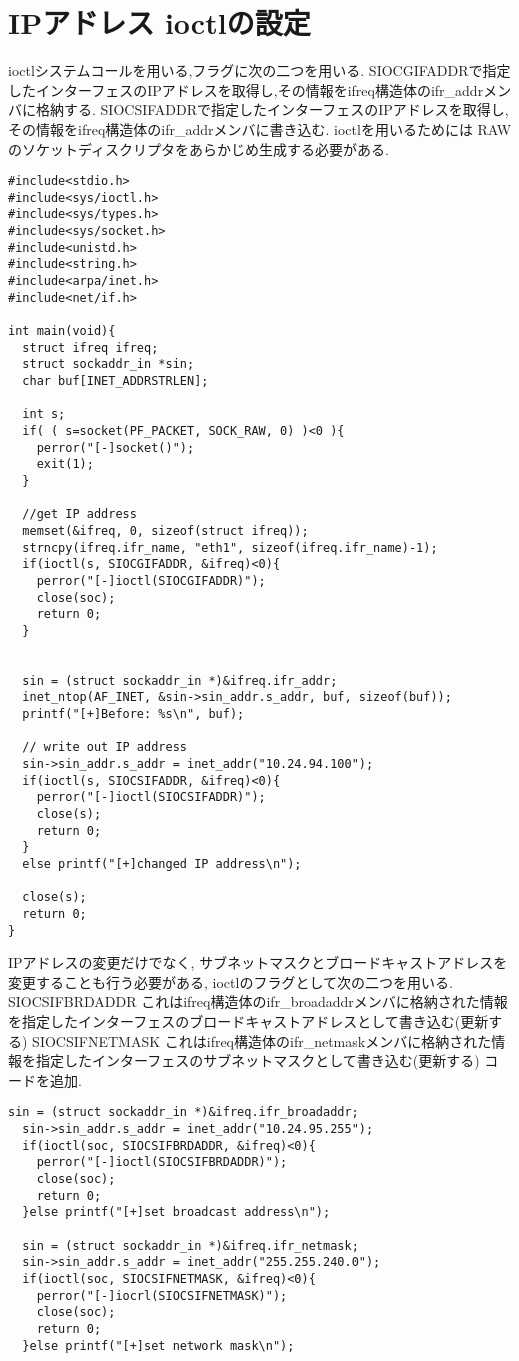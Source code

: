 \documentclass[a4paper]{article}%
\begin{document}
\section{IPアドレス ioctlの設定}
ioctlシステムコールを用いる,フラグに次の二つを用いる.
SIOCGIFADDRで指定したインターフェスのIPアドレスを取得し,その情報をifreq構造体のifr\_addrメンバに格納する.
SIOCSIFADDRで指定したインターフェスのIPアドレスを取得し,その情報をifreq構造体のifr\_addrメンバに書き込む.
ioctlを用いるためには RAWのソケットディスクリプタをあらかじめ生成する必要がある.

\begin{lstlisting}[caption=changeIPaddress, label=changeIPaddress]
#include<stdio.h>
#include<sys/ioctl.h>
#include<sys/types.h>
#include<sys/socket.h>
#include<unistd.h>
#include<string.h>
#include<arpa/inet.h>
#include<net/if.h>
 
int main(void){
  struct ifreq ifreq;
  struct sockaddr_in *sin;
  char buf[INET_ADDRSTRLEN];
 
  int s;
  if( ( s=socket(PF_PACKET, SOCK_RAW, 0) )<0 ){
    perror("[-]socket()");
    exit(1);
  }
  
  //get IP address
  memset(&ifreq, 0, sizeof(struct ifreq));
  strncpy(ifreq.ifr_name, "eth1", sizeof(ifreq.ifr_name)-1);
  if(ioctl(s, SIOCGIFADDR, &ifreq)<0){
    perror("[-]ioctl(SIOCGIFADDR)");
    close(soc);
    return 0;
  }
 

  sin = (struct sockaddr_in *)&ifreq.ifr_addr;
  inet_ntop(AF_INET, &sin->sin_addr.s_addr, buf, sizeof(buf));
  printf("[+]Before: %s\n", buf);
 
  // write out IP address 
  sin->sin_addr.s_addr = inet_addr("10.24.94.100");
  if(ioctl(s, SIOCSIFADDR, &ifreq)<0){
    perror("[-]ioctl(SIOCSIFADDR)");
    close(s);
    return 0;
  }
  else printf("[+]changed IP address\n");
 
  close(s);
  return 0;
}
\end{lstlisting}

IPアドレスの変更だけでなく,
サブネットマスクとブロードキャストアドレスを変更することも行う必要がある,
ioctlのフラグとして次の二つを用いる.
SIOCSIFBRDADDR これはifreq構造体のifr\_broadaddrメンバに格納された情報を指定したインターフェスのブロードキャストアドレスとして書き込む(更新する)
SIOCSIFNETMASK これはifreq構造体のifr\_netmaskメンバに格納された情報を指定したインターフェスのサブネットマスクとして書き込む(更新する)
コードを追加.
\begin{lstlisting}[caption=changeSubnetmaskandBroadcastaddress, label=changeSubnetmaskandBroadcastaddress]
sin = (struct sockaddr_in *)&ifreq.ifr_broadaddr;
  sin->sin_addr.s_addr = inet_addr("10.24.95.255");
  if(ioctl(soc, SIOCSIFBRDADDR, &ifreq)<0){
    perror("[-]ioctl(SIOCSIFBRDADDR)");
    close(soc);
    return 0;
  }else printf("[+]set broadcast address\n");
 
  sin = (struct sockaddr_in *)&ifreq.ifr_netmask;
  sin->sin_addr.s_addr = inet_addr("255.255.240.0");
  if(ioctl(soc, SIOCSIFNETMASK, &ifreq)<0){
    perror("[-]iocrl(SIOCSIFNETMASK)");
    close(soc);
    return 0;
  }else printf("[+]set network mask\n");

\end{lstlisting}
\end{document}
